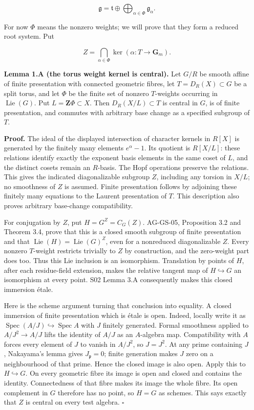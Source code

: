 \documentclass[11pt,a4paper,openany]{report}
\begin{document}
\[
\mathfrak g=\mathfrak t\oplus\bigoplus_{\alpha\in\Phi}\mathfrak g_\alpha.
\]

For now \(\Phi\) means the nonzero weights; we will prove that they form a reduced root system. Put

\[
Z=\bigcap_{\alpha\in\Phi}\ker(\alpha:T\to\mathbf G_m).
\]

\textbf{Lemma 1.A (the torus weight kernel is central).} Let \(G/R\) be smooth affine of finite presentation with connected geometric fibres, let \(T=D_R(X)\subset G\) be a split torus, and let \(\Phi\) be the finite set of nonzero \(T\)-weights occurring in \(\operatorname{Lie}(G)\). Put \(L=\mathbf Z\Phi\subset X\). Then \(D_R(X/L)\subset T\) is central in \(G\), is of finite presentation, and commutes with arbitrary base change as a specified subgroup of \(T\).

\textbf{Proof.} The ideal of the displayed intersection of character kernels in \(R[X]\) is generated by the finitely many elements \(e^\alpha-1\). Its quotient is \(R[X/L]\): these relations identify exactly the exponent basis elements in the same coset of \(L\), and the distinct cosets remain an \(R\)-basis. The Hopf operations preserve the relations. This gives the indicated diagonalizable subgroup \(Z\), including any torsion in \(X/L\); no smoothness of \(Z\) is assumed. Finite presentation follows by adjoining these finitely many equations to the Laurent presentation of \(T\). This description also proves arbitrary base-change compatibility.

For conjugation by \(Z\), put \(H=G^Z=C_G(Z)\). AG-GS-05, Proposition 3.2 and Theorem 3.4, prove that this is a closed smooth subgroup of finite presentation and that \(\operatorname{Lie}(H)=\operatorname{Lie}(G)^Z\), even for a nonreduced diagonalizable \(Z\). Every nonzero \(T\)-weight restricts trivially to \(Z\) by construction, and the zero-weight part does too. Thus this Lie inclusion is an isomorphism. Translation by points of \(H\), after each residue-field extension, makes the relative tangent map of \(H\hookrightarrow G\) an isomorphism at every point. S02 Lemma 3.A consequently makes this closed immersion étale.

Here is the scheme argument turning that conclusion into equality. A closed immersion of finite presentation which is étale is open. Indeed, locally write it as \(\operatorname{Spec}(A/J)\hookrightarrow\operatorname{Spec}A\) with \(J\) finitely generated. Formal smoothness applied to \(A/J^2\to A/J\) lifts the identity of \(A/J\) as an \(A\)-algebra map. Compatibility with \(A\) forces every element of \(J\) to vanish in \(A/J^2\), so \(J=J^2\). At any prime containing \(J\), Nakayama's lemma gives \(J_{\mathfrak p}=0\); finite generation makes \(J\) zero on a neighbourhood of that prime. Hence the closed image is also open. Apply this to \(H\hookrightarrow G\). On every geometric fibre its image is open and closed and contains the identity. Connectedness of that fibre makes its image the whole fibre. Its open complement in \(G\) therefore has no point, so \(H=G\) as schemes. This says exactly that \(Z\) is central on every test algebra. \(\square\)
\end{document}
